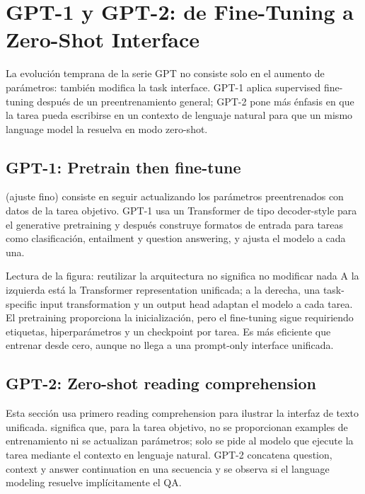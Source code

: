 \section{GPT-1 y GPT-2: de Fine-Tuning a Zero-Shot Interface}

La evolución temprana de la serie GPT no consiste solo en el aumento de parámetros: también modifica la task interface. GPT-1 aplica supervised fine-tuning después de un preentrenamiento general; GPT-2 pone más énfasis en que la tarea pueda escribirse en un contexto de lenguaje natural para que un mismo language model la resuelva en modo zero-shot.

\subsection{GPT-1: Pretrain then fine-tune}

 (ajuste fino) consiste en seguir actualizando los parámetros preentrenados con datos de la tarea objetivo. GPT-1 usa un Transformer de tipo decoder-style para el generative pretraining y después construye formatos de entrada para tareas como clasificación, entailment y question answering, y ajusta el modelo a cada una.


\begin{knowledgebox}{Lectura de la figura: reutilizar la arquitectura no significa no modificar nada}
A la izquierda está la Transformer representation unificada; a la derecha, una task-specific input transformation y un output head adaptan el modelo a cada tarea. El pretraining proporciona la inicialización, pero el fine-tuning sigue requiriendo etiquetas, hiperparámetros y un checkpoint por tarea. Es más eficiente que entrenar desde cero, aunque no llega a una prompt-only interface unificada.
\end{knowledgebox}

\subsection{GPT-2: Zero-shot reading comprehension}

Esta sección usa primero reading comprehension para ilustrar la interfaz de texto unificada.  significa que, para la tarea objetivo, no se proporcionan examples de entrenamiento ni se actualizan parámetros; solo se pide al modelo que ejecute la tarea mediante el contexto en lenguaje natural. GPT-2 concatena question, context y answer continuation en una secuencia y se observa si el language modeling resuelve implícitamente el QA.

